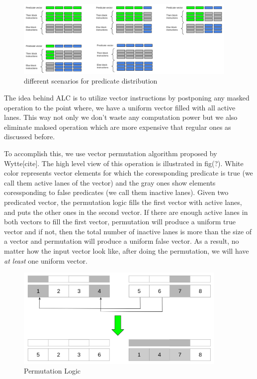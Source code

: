 \documentclass[\main/thesis.tex]{subfiles}
\begin{document}
\begin{figure}[t!]
    \centering
    \includegraphics[width=0.95\textwidth]{img/condition_distribution.png}
    \caption{different scenarios for predicate distribution}
    \label{fig:predicate_distribution}
\end{figure}

The idea behind ALC is to utilize vector instructions by postponing any masked operation to the point where, we have a uniform vector filled with all active lanes. This way not only we don't waste any computation power but we also eliminate maksed operation which are more expensive that regular ones as discussed before.

To accomplish this, we use vector permutation algorithm proposed by Wytte[cite]. The high level view of this operation is illustrated in fig(?). White color represents vector elements for which the coressponding predicate is true (we call them active lanes of the vector) and the gray ones show elements coressponding to false predicates (we call them inactive lanes).
Given two predicated vector, the permutation logic fills the first vector with active lanes, and puts the other ones in the second vector. If there are enough active lanes in both vectors to fill the first vector, permutation will produce a uniform true vector and if not, then the total number of inactive lanes is more than the size of a vector and permutation will produce
a uniform false vector. As a result, no matter how the input vector look like, after doing the permutation, we will have \emph{at least} one uniform vector.

\begin{figure}[t!]
    \centering
    \includegraphics[width=0.90\textwidth]{img/permutation.png}
    \caption{Permutation Logic}
    \label{fig:permutation}
\end{figure}
\end{document}
